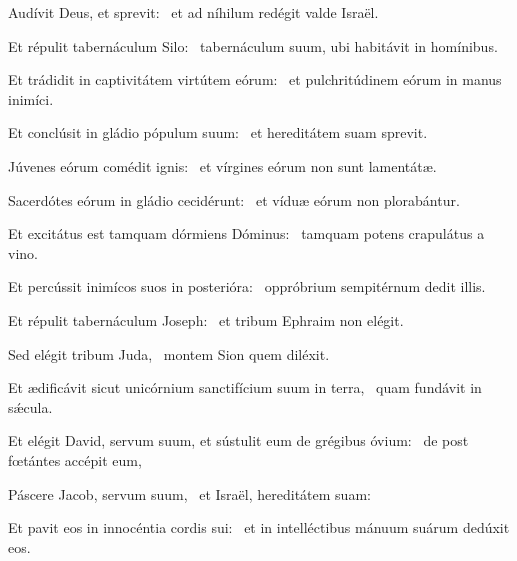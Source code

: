 
\item Audívit Deus, et sprevit:~\psstar{} et ad níhilum redégit valde Israël.

\item Et répulit tabernáculum Silo:~\psstar{} tabernáculum suum, ubi habitávit in homínibus.

\item Et trádidit in captivitátem virtútem eórum:~\psstar{} et pulchritúdinem eórum in manus inimíci.

\item Et conclúsit in gládio pópulum suum:~\psstar{} et hereditátem suam sprevit.

\item Júvenes eórum comédit ignis:~\psstar{} et vírgines eórum non sunt lamentátæ.

\item Sacerdótes eórum in gládio cecidérunt:~\psstar{} et víduæ eórum non plorabántur.

\item Et excitátus est tamquam dórmiens Dóminus:~\psstar{} tamquam potens crapulátus a vino.

\item Et percússit inimícos suos in posterióra:~\psstar{} oppróbrium sempitérnum dedit illis.

\item Et répulit tabernáculum Joseph:~\psstar{} et tribum Ephraim non elégit.

\item Sed elégit tribum Juda,~\psstar{} montem Sion quem diléxit.

\item Et ædificávit sicut unicórnium sanctifícium suum in terra,~\psstar{} quam fundávit in sǽcula.

\item Et elégit David, servum suum, et sústulit eum de grégibus óvium:~\psstar{} de post fœtántes accépit eum,

\item Páscere Jacob, servum suum,~\psstar{} et Israël, hereditátem suam:

\item Et pavit eos in innocéntia cordis sui:~\psstar{} et in intelléctibus mánuum suárum dedúxit eos.
